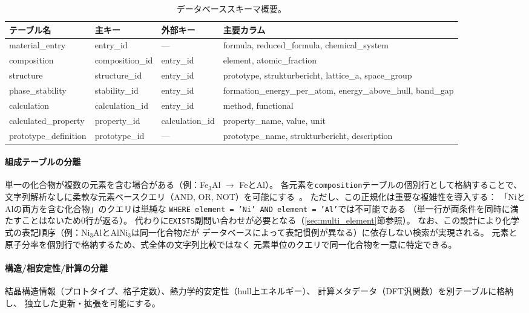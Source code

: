 \documentclass[5p,twocolumn]{elsarticle}
\begin{document}
\begin{table}[htbp]
  \centering
  \caption{データベーススキーマ概要。}
  \label{tab:schema}
  \small
  \begin{tabularx}{\textwidth}{lllX}
    \toprule
    テーブル名 & 主キー & 外部キー & 主要カラム \\
    \midrule
    material\_entry & entry\_id & --- & formula, reduced\_formula, chemical\_system \\
    composition & composition\_id & entry\_id & element, atomic\_fraction \\
    structure & structure\_id & entry\_id & prototype, strukturbericht, lattice\_a, space\_group \\
    phase\_stability & stability\_id & entry\_id & formation\_energy\_per\_atom, energy\_above\_hull, band\_gap \\
    calculation & calculation\_id & entry\_id & method, functional \\
    calculated\_property & property\_id & calculation\_id & property\_name, value, unit \\
    prototype\_definition & prototype\_id & --- & prototype\_name, strukturbericht, description \\
    \bottomrule
  \end{tabularx}
\end{table}

\paragraph{組成テーブルの分離}
単一の化合物が複数の元素を含む場合がある（例：Fe$_3$Al $\to$ FeとAl）。
各元素を\texttt{composition}テーブルの個別行として格納することで、
文字列解析なしに柔軟な元素ベースクエリ（AND, OR, NOT）を可能にする~\citep{villars2004pauling}。
ただし、この正規化は重要な複雑性を導入する：
「NiとAlの両方を含む化合物」のクエリは単純な
\texttt{WHERE element = 'Ni' AND element = 'Al'}では不可能である
（単一行が両条件を同時に満たすことはないため0行が返る）。
代わりに\texttt{EXISTS}副問い合わせが必要となる（\ref{sec:multi_element}節参照）。
なお、この設計により化学式の表記順序（例：Ni$_3$AlとAlNi$_3$は同一化合物だが
データベースによって表記慣例が異なる）に依存しない検索が実現される。
元素と原子分率を個別行で格納するため、式全体の文字列比較ではなく
元素単位のクエリで同一化合物を一意に特定できる。

\paragraph{構造/相安定性/計算の分離}
結晶構造情報（プロトタイプ、格子定数）、熱力学的安定性（hull上エネルギー）、
計算メタデータ（DFT汎関数）を別テーブルに格納し、
独立した更新・拡張を可能にする。
\end{document}
